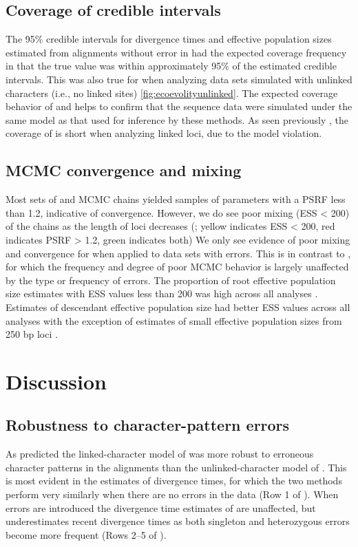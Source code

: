 \subsection{Coverage of credible intervals}
The 95\% credible intervals for divergence times and effective population sizes
estimated from alignments without error in \beast had the expected coverage
frequency in that the true value was within approximately 95\% of the estimated
credible intervals. 
This was also true for \ecoevolity when analyzing data sets simulated with
unlinked characters (i.e., no linked sites) \cref{fig:ecoevolityunlinked}.
The expected coverage behavior of \beast and \ecoevolity helps to confirm that
the sequence data were simulated under the same model as that used for
inference by these methods. 
As seen previously \citep{Oaks2018ecoevolity}, the coverage of \ecoevolity is
short when analyzing linked loci, due to the model violation.

\subsection{MCMC convergence and mixing}
Most sets of \beast and \ecoevolity MCMC chains yielded samples of parameters with
a PSRF less than 1.2, indicative of convergence.
However, we do see poor mixing (ESS < 200) of the \beast chains as the length
of loci decreases (\mainfigs;
yellow indicates ESS < 200, red indicates PSRF > 1.2, green indicates both)
We only see evidence of poor mixing and convergence for \ecoevolity when
applied to data sets with errors.
This is in contrast to \beast, for which the frequency and degree of poor MCMC
behavior is largely unaffected by the type or frequency of errors.
The proportion of \beast root effective population size estimates with ESS 
values less than 200 was high across all analyses \rootfigsp.
Estimates of descendant effective population size had better ESS values across all 
analyses with the exception of estimates of small effective population sizes from 
250 bp loci \thetafigsp.


\section{Discussion}


\subsection{Robustness to character-pattern errors}
As predicted the linked-character model of \beast was more robust to erroneous
character patterns in the alignments than the unlinked-character model of
\ecoevolity.
This is most evident in the estimates of divergence times, for which
the two methods perform very similarly when there are no errors in the
data (Row 1 of \timefigs).
When errors are introduced the divergence time estimates of \beast are
unaffected, but \ecoevolity underestimates recent divergence times as both
singleton and heterozygous errors become more frequent (Rows 2--5 of
\timefigs).

